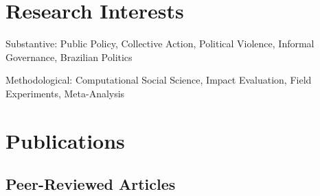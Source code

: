 \documentclass[a4paper]{article}
\renewenvironment{itemize}{
	\begin{list}{}{
			\setlength{\leftmargin}{1.5em}
		}
		}{
	\end{list}
}
\begin{document}
\section*{Research Interests}

\begin{itemize}
\item Substantive: Public Policy, Collective Action, Political Violence, Informal Governance, Brazilian Politics
\item Methodological: Computational Social Science, Impact Evaluation, Field Experiments, Meta-Analysis
\end{itemize}

\section*{Publications}

\subsection*{Peer-Reviewed Articles}
\end{document}

